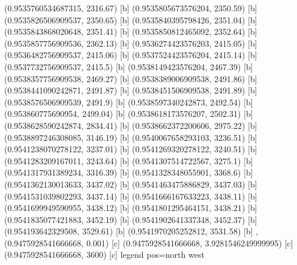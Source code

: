 {{{(0.9535760534687315, 2316.67) [b] 
(0.9535805673576204, 2350.59) [b] 
(0.9535826506909537, 2350.65) [b] 
(0.9535840395798426, 2351.04) [b] 
(0.9535843868020648, 2351.41) [b] 
(0.9535850812465092, 2352.64) [b] 
(0.9535857756909536, 2362.13) [b] 
(0.9536274423576203, 2415.05) [b] 
(0.9536482756909537, 2415.06) [b] 
(0.9537524423576204, 2415.14) [b] 
(0.9537732756909537, 2415.5) [b] 
(0.9538149423576204, 2467.39) [b] 
(0.9538357756909538, 2469.27) [b] 
(0.9538389006909538, 2491.86) [b] 
(0.9538441090242871, 2491.87) [b] 
(0.9538451506909538, 2491.89) [b] 
(0.9538576506909539, 2491.9) [b] 
(0.9538597340242873, 2492.54) [b] 
(0.953860775690954, 2499.04) [b] 
(0.9538618173576207, 2502.31) [b] 
(0.9538628590242874, 2834.41) [b] 
(0.9538662372200606, 2975.22) [b] 
(0.9538897246308085, 3146.19) [b] 
(0.9540067658293103, 3236.51) [b] 
(0.9541238070278122, 3237.01) [b] 
(0.9541269320278122, 3240.51) [b] 
(0.9541283209167011, 3243.64) [b] 
(0.9541307514722567, 3275.1) [b] 
(0.9541317931389234, 3316.39) [b] 
(0.9541328348055901, 3368.6) [b] 
(0.9541362130013633, 3437.02) [b] 
(0.9541463475886829, 3437.03) [b] 
(0.9541531039802293, 3437.14) [b] 
(0.9541666167633223, 3438.11) [b] 
(0.9541699949590955, 3438.12) [b] 
(0.9541801295464151, 3438.21) [b] 
(0.9541835077421883, 3452.19) [b] 
(0.9541902641337348, 3452.37) [b] 
(0.954193642329508, 3529.61) [b] 
(0.9541970205252812, 3531.58) [b] 
},{(0.9475928541666668, 0.001) [c] 
(0.9475928541666668, 3.9281546249999995) [c] 
(0.9475928541666668, 3600) [c] 
}}}{legend pos=north west}